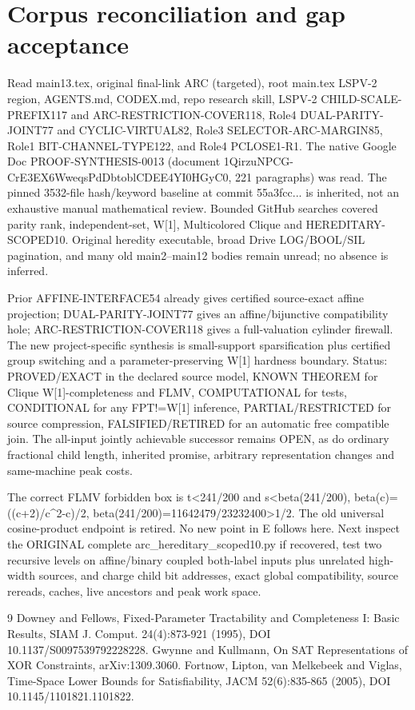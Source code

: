 \documentclass[11pt]{article}
\begin{document}
\section{Corpus reconciliation and gap acceptance}
Read main13.tex, original final-link ARC (targeted), root main.tex LSPV-2 region, AGENTS.md, CODEX.md, repo research skill, LSPV-2 CHILD-SCALE-PREFIX117 and ARC-RESTRICTION-COVER118, Role4 DUAL-PARITY-JOINT77 and CYCLIC-VIRTUAL82, Role3 SELECTOR-ARC-MARGIN85, Role1 BIT-CHANNEL-TYPE122, and Role4 PCLOSE1-R1. The native Google Doc PROOF-SYNTHESIS-0013 (document 1QirzuNPCG-CrE3EX6WweqsPdDbtoblCDEE4YI0HGyC0, 221 paragraphs) was read. The pinned 3532-file hash/keyword baseline at commit 55a3fcc... is inherited, not an exhaustive manual mathematical review. Bounded GitHub searches covered parity rank, independent-set, W[1], Multicolored Clique and HEREDITARY-SCOPED10. Original heredity executable, broad Drive LOG/BOOL/SIL pagination, and many old main2--main12 bodies remain unread; no absence is inferred.

Prior AFFINE-INTERFACE54 already gives certified source-exact affine projection; DUAL-PARITY-JOINT77 gives an affine/bijunctive compatibility hole; ARC-RESTRICTION-COVER118 gives a full-valuation cylinder firewall. The new project-specific synthesis is small-support sparsification plus certified group switching and a parameter-preserving W[1] hardness boundary. Status: PROVED/EXACT in the declared source model, KNOWN THEOREM for Clique W[1]-completeness and FLMV, COMPUTATIONAL for tests, CONDITIONAL for any FPT!=W[1] inference, PARTIAL/RESTRICTED for source compression, FALSIFIED/RETIRED for an automatic free compatible join. The all-input jointly achievable successor remains OPEN, as do ordinary fractional child length, inherited promise, arbitrary representation changes and same-machine peak costs.

The correct FLMV forbidden box is t<241/200 and s<beta(241/200), beta(c)=((c+2)/c^2-c)/2, beta(241/200)=11642479/23232400>1/2. The old universal cosine-product endpoint is retired. No new point in E follows here. Next inspect the ORIGINAL complete arc_hereditary_scoped10.py if recovered, test two recursive levels on affine/binary coupled both-label inputs plus unrelated high-width sources, and charge child bit addresses, exact global compatibility, source rereads, caches, live ancestors and peak work space.

\begin{thebibliography}{9}
 Downey and Fellows, Fixed-Parameter Tractability and Completeness I: Basic Results, SIAM J. Comput. 24(4):873-921 (1995), DOI 10.1137/S0097539792228228.
 Gwynne and Kullmann, On SAT Representations of XOR Constraints, arXiv:1309.3060.
 Fortnow, Lipton, van Melkebeek and Viglas, Time-Space Lower Bounds for Satisfiability, JACM 52(6):835-865 (2005), DOI 10.1145/1101821.1101822.
\end{thebibliography}
\end{document}
